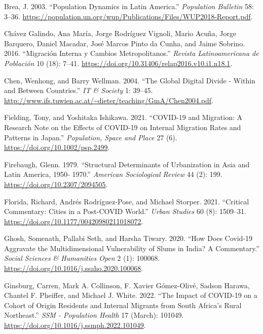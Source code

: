 \documentclass[11pt,letterpaper]{article}
\newlength{\cslhangindent}
\newlength{\cslentryspacingunit} %
\newenvironment{CSLReferences}[2] %
 {%
  \setlength{\parindent}{0pt}
  \ifodd #1
  \let\oldpar\par
  \def\par{\hangindent=\cslhangindent\oldpar}
  \fi
  \setlength{\parskip}{#2\cslentryspacingunit}
 }%
 {}
\begin{document}
\begin{CSLReferences}{1}{0}
\leavevmode{}%
Brea, J. 2003. {``Population Dynamics in Latin America.''}
\emph{Population Bulletin} 58: 3--36.
\url{https://population.un.org/wup/Publications/Files/WUP2018-Report.pdf}.

\leavevmode{}%
Chávez Galindo, Ana María, Jorge Rodríguez Vignoli, Mario Acuña, Jorge
Barquero, Daniel Macadar, José Marcos Pinto da Cunha, and Jaime Sobrino.
2016. {``Migración Interna y Cambios Metropolitanos.''} \emph{Revista
Latinoamericana de Población} 10 (18): 7--41.
\url{https://doi.org/10.31406/relap2016.v10.i1.n18.1}.

\leavevmode{}%
Chen, Wenhong, and Barry Wellman. 2004. {``The Global Digital Divide -
Within and Between Countries.''} \emph{IT \& Society} 1: 39--45.
\url{http://www.ifs.tuwien.ac.at/~dieter/teaching/GmA/Chen2004.pdf}.

\leavevmode{}%
Fielding, Tony, and Yoshitaka Ishikawa. 2021. {``COVID{-}19 and
Migration: A Research Note on the Effects of COVID{-}19 on Internal
Migration Rates and Patterns in Japan.''} \emph{Population, Space and
Place} 27 (6). \url{https://doi.org/10.1002/psp.2499}.

\leavevmode{}%
Firebaugh, Glenn. 1979. {``Structural Determinants of Urbanization in
Asia and Latin America, 1950- 1970.''} \emph{American Sociological
Review} 44 (2): 199. \url{https://doi.org/10.2307/2094505}.

\leavevmode{}%
Florida, Richard, Andrés Rodríguez-Pose, and Michael Storper. 2021.
{``Critical Commentary: Cities in a Post-COVID World.''} \emph{Urban
Studies} 60 (8): 1509--31.
\url{https://doi.org/10.1177/00420980211018072}.

\leavevmode{}%
Ghosh, Somenath, Pallabi Seth, and Harsha Tiwary. 2020. {``How Does
Covid-19 Aggravate the Multidimensional Vulnerability of Slums in India?
A Commentary.''} \emph{Social Sciences \& Humanities Open} 2 (1):
100068. \url{https://doi.org/10.1016/j.ssaho.2020.100068}.

\leavevmode{}%
Ginsburg, Carren, Mark A. Collinson, F. Xavier Gómez-Olivé, Sadson
Harawa, Chantel F. Pheiffer, and Michael J. White. 2022. {``The Impact
of COVID-19 on a Cohort of Origin Residents and Internal Migrants from
South Africa's Rural Northeast.''} \emph{SSM - Population Health} 17
(March): 101049. \url{https://doi.org/10.1016/j.ssmph.2022.101049}.


\end{CSLReferences}
\end{document}
